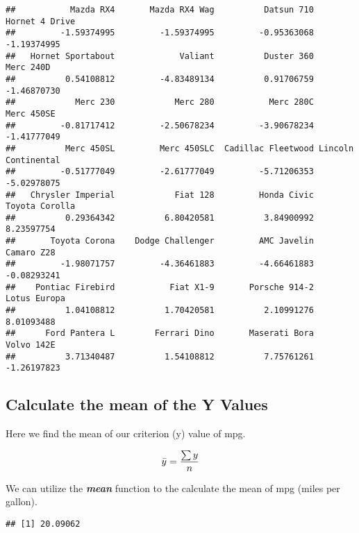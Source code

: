\documentclass[
]{book}
\newenvironment{Shaded}{\begin{snugshade}}{\end{snugshade}}
\newcommand{\FunctionTok}[1]{\textcolor[rgb]{0.13,0.29,0.53}{\textbf{#1}}}
\newcommand{\NormalTok}[1]{#1}
\newcommand{\SpecialCharTok}[1]{\textcolor[rgb]{0.81,0.36,0.00}{\textbf{#1}}}
\theoremstyle{definition}
\theoremstyle{definition}
\theoremstyle{definition}
\theoremstyle{definition}
\theoremstyle{remark}
\begin{document}
\begin{verbatim}
##           Mazda RX4       Mazda RX4 Wag          Datsun 710      Hornet 4 Drive 
##         -1.59374995         -1.59374995         -0.95363068         -1.19374995 
##   Hornet Sportabout             Valiant          Duster 360           Merc 240D 
##          0.54108812         -4.83489134          0.91706759         -1.46870730 
##            Merc 230            Merc 280           Merc 280C          Merc 450SE 
##         -0.81717412         -2.50678234         -3.90678234         -1.41777049 
##          Merc 450SL         Merc 450SLC  Cadillac Fleetwood Lincoln Continental 
##         -0.51777049         -2.61777049         -5.71206353         -5.02978075 
##   Chrysler Imperial            Fiat 128         Honda Civic      Toyota Corolla 
##          0.29364342          6.80420581          3.84900992          8.23597754 
##       Toyota Corona    Dodge Challenger         AMC Javelin          Camaro Z28 
##         -1.98071757         -4.36461883         -4.66461883         -0.08293241 
##    Pontiac Firebird           Fiat X1-9       Porsche 914-2        Lotus Europa 
##          1.04108812          1.70420581          2.10991276          8.01093488 
##      Ford Pantera L        Ferrari Dino       Maserati Bora          Volvo 142E 
##          3.71340487          1.54108812          7.75761261         -1.26197823
\end{verbatim}

\hypertarget{calculate-the-mean-of-the-y-values}{%
\subsection{Calculate the mean of the Y Values}\label{calculate-the-mean-of-the-y-values}}

Here we find the mean of our criterion (y) value of mpg.

\[\Large
\bar{y} = \frac{\sum{y}}{n}
\]

We can utilize the \textbf{\emph{mean}} function to the calculate the mean of mpg (miles per gallon).

\begin{Shaded}
\end{Shaded}

\begin{verbatim}
## [1] 20.09062
\end{verbatim}
\end{document}
